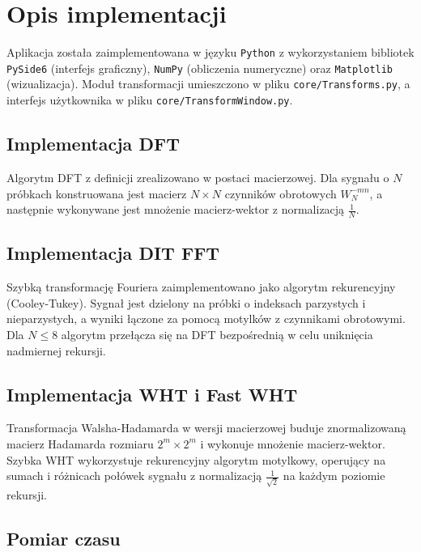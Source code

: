 \documentclass[12pt]{article}
\begin{document}
\section{Opis implementacji}

Aplikacja została zaimplementowana w języku \texttt{Python} z wykorzystaniem bibliotek \texttt{PySide6} (interfejs graficzny), \texttt{NumPy} (obliczenia numeryczne) oraz \texttt{Matplotlib} (wizualizacja). Moduł transformacji umieszczono w pliku \texttt{core/Transforms.py}, a interfejs użytkownika w pliku \texttt{core/TransformWindow.py}.

\subsection{Implementacja DFT}

Algorytm DFT z definicji zrealizowano w postaci macierzowej. Dla sygnału o $N$ próbkach konstruowana jest macierz $N \times N$ czynników obrotowych $W_N^{-mn}$, a następnie wykonywane jest mnożenie macierz-wektor z normalizacją $\frac{1}{N}$.

\subsection{Implementacja DIT FFT}

Szybką transformację Fouriera zaimplementowano jako algorytm rekurencyjny (Cooley-Tukey). Sygnał jest dzielony na próbki o indeksach parzystych i nieparzystych, a wyniki łączone za pomocą motylków z czynnikami obrotowymi. Dla $N \leq 8$ algorytm przełącza się na DFT bezpośrednią w celu uniknięcia nadmiernej rekursji.

\subsection{Implementacja WHT i Fast WHT}

Transformacja Walsha-Hadamarda w wersji macierzowej buduje znormalizowaną macierz Hadamarda rozmiaru $2^m \times 2^m$ i wykonuje mnożenie macierz-wektor. Szybka WHT wykorzystuje rekurencyjny algorytm motylkowy, operujący na sumach i różnicach połówek sygnału z normalizacją $\frac{1}{\sqrt{2}}$ na każdym poziomie rekursji.

\subsection{Pomiar czasu}
\end{document}
